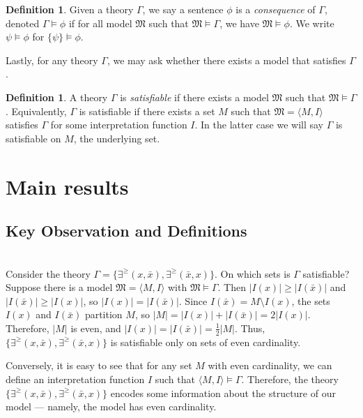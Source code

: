 \documentclass[12pt, reqno]{amsart}
\theoremstyle{definition}
\newtheorem{definition}[theorem]{Definition}
\theoremstyle{remark}
\numberwithin{equation}{section}
\begin{document}
\begin{definition}
Given a theory $\Gamma$, we say a sentence $\phi$ is a \textit{consequence} of $\Gamma$, denoted $\Gamma \models \phi$ if for all model $\mathfrak{M}$ such that $\mathfrak{M}  \models \Gamma$, we have $\mathfrak{M}  \models \phi$. We write $\psi \models \phi$ for $\{\psi\} \models \phi$. 
\end{definition}

Lastly, for any theory $\Gamma$, we may ask whether there exists a model that satisfies $\Gamma$. 

\begin{definition}
A theory $\Gamma$ is \textit{satisfiable} if there exists a model $\mathfrak{M}$ such that $\mathfrak{M}  \models \Gamma$. Equivalently, $\Gamma$ is satisfiable if there exists a set $M$ such that $\mathfrak{M} = \langle M, I\rangle$ satisfies $\Gamma$ for some interpretation function $I$. In the latter case we will say $\Gamma$ is satisfiable on $M$, the underlying set. 
\end{definition}

\newpage

\section{Main results}
\subsection{Key Observation and Definitions} \hfill \\ 

Consider the theory $\Gamma = \{\exists^{\geq}(x, \bar{x}), \exists^{\geq}(\bar{x}, x)\}$. On which sets is $\Gamma$ satisfiable? \\ 

Suppose there is a model $\mathfrak{M} = \langle M, I\rangle$ with
$\mathfrak{M} \models \Gamma$. Then $|I(x)| \geq |I(\bar{x})|$ and
$|I(\bar{x})| \geq |I(x)|$, so $|I(x)| = |I(\bar{x})|$. Since $I(\bar{x}) = M \setminus I(x)$,
the sets $I(x)$ and $I(\bar{x})$ partition $M$, so
$|M| = |I(x)| + |I(\bar{x})| = 2|I(x)|$. Therefore, $|M|$ is even, and
$|I(x)| = |I(\bar{x})| = \frac{1}{2}|M|$. Thus,
$\{\exists^{\geq}(x, \bar{x}), \exists^{\geq}(\bar{x}, x)\}$ is satisfiable only on sets
of even cardinality.

Conversely, it is easy to see that for any set $M$ with even cardinality, we can define an interpretation function $I$ such that $\langle M, I\rangle \models \Gamma$. Therefore, the theory $\{\exists^{\geq}(x, \bar{x}), \exists^{\geq}(\bar{x}, x)\}$ encodes some information about the structure of our model --- namely, the model has even cardinality.
\end{document}
